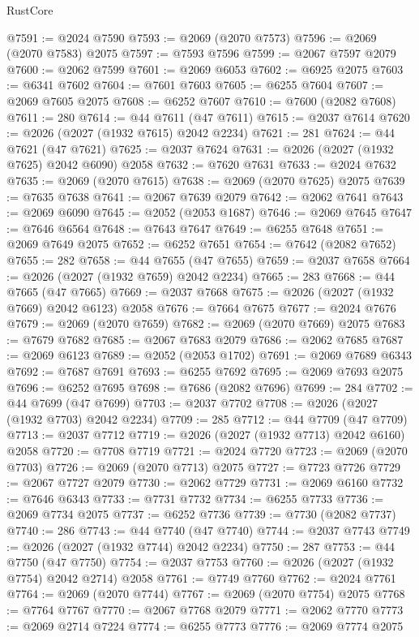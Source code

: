 \begin{lexlean}{RustCore}
\begin{coremodule}
@7591 := @2024 @7590
@7593 := @2069 (@2070 @7573)
@7596 := @2069 (@2070 @7583) @2075
@7597 := @7593 @7596
@7599 := @2067 @7597 @2079
@7600 := @2062 @7599
@7601 := @2069 @6053
@7602 := @6925 @2075
@7603 := @6341 @7602
@7604 := @7601 @7603
@7605 := @6255 @7604
@7607 := @2069 @7605 @2075
@7608 := @6252 @7607
@7610 := @7600 (@2082 @7608)
@7611 := 280
@7614 := @44 @7611 (@47 @7611)
@7615 := @2037 @7614
@7620 := @2026 (@2027 (@1932 @7615) @2042 @2234)
@7621 := 281
@7624 := @44 @7621 (@47 @7621)
@7625 := @2037 @7624
@7631 := @2026 (@2027 (@1932 @7625) @2042 @6090) @2058
@7632 := @7620 @7631
@7633 := @2024 @7632
@7635 := @2069 (@2070 @7615)
@7638 := @2069 (@2070 @7625) @2075
@7639 := @7635 @7638
@7641 := @2067 @7639 @2079
@7642 := @2062 @7641
@7643 := @2069 @6090
@7645 := @2052 (@2053 @1687)
@7646 := @2069 @7645
@7647 := @7646 @6564
@7648 := @7643 @7647
@7649 := @6255 @7648
@7651 := @2069 @7649 @2075
@7652 := @6252 @7651
@7654 := @7642 (@2082 @7652)
@7655 := 282
@7658 := @44 @7655 (@47 @7655)
@7659 := @2037 @7658
@7664 := @2026 (@2027 (@1932 @7659) @2042 @2234)
@7665 := 283
@7668 := @44 @7665 (@47 @7665)
@7669 := @2037 @7668
@7675 := @2026 (@2027 (@1932 @7669) @2042 @6123) @2058
@7676 := @7664 @7675
@7677 := @2024 @7676
@7679 := @2069 (@2070 @7659)
@7682 := @2069 (@2070 @7669) @2075
@7683 := @7679 @7682
@7685 := @2067 @7683 @2079
@7686 := @2062 @7685
@7687 := @2069 @6123
@7689 := @2052 (@2053 @1702)
@7691 := @2069 @7689 @6343
@7692 := @7687 @7691
@7693 := @6255 @7692
@7695 := @2069 @7693 @2075
@7696 := @6252 @7695
@7698 := @7686 (@2082 @7696)
@7699 := 284
@7702 := @44 @7699 (@47 @7699)
@7703 := @2037 @7702
@7708 := @2026 (@2027 (@1932 @7703) @2042 @2234)
@7709 := 285
@7712 := @44 @7709 (@47 @7709)
@7713 := @2037 @7712
@7719 := @2026 (@2027 (@1932 @7713) @2042 @6160) @2058
@7720 := @7708 @7719
@7721 := @2024 @7720
@7723 := @2069 (@2070 @7703)
@7726 := @2069 (@2070 @7713) @2075
@7727 := @7723 @7726
@7729 := @2067 @7727 @2079
@7730 := @2062 @7729
@7731 := @2069 @6160
@7732 := @7646 @6343
@7733 := @7731 @7732
@7734 := @6255 @7733
@7736 := @2069 @7734 @2075
@7737 := @6252 @7736
@7739 := @7730 (@2082 @7737)
@7740 := 286
@7743 := @44 @7740 (@47 @7740)
@7744 := @2037 @7743
@7749 := @2026 (@2027 (@1932 @7744) @2042 @2234)
@7750 := 287
@7753 := @44 @7750 (@47 @7750)
@7754 := @2037 @7753
@7760 := @2026 (@2027 (@1932 @7754) @2042 @2714) @2058
@7761 := @7749 @7760
@7762 := @2024 @7761
@7764 := @2069 (@2070 @7744)
@7767 := @2069 (@2070 @7754) @2075
@7768 := @7764 @7767
@7770 := @2067 @7768 @2079
@7771 := @2062 @7770
@7773 := @2069 @2714 @7224
@7774 := @6255 @7773
@7776 := @2069 @7774 @2075

\end{coremodule}
\end{lexlean}
